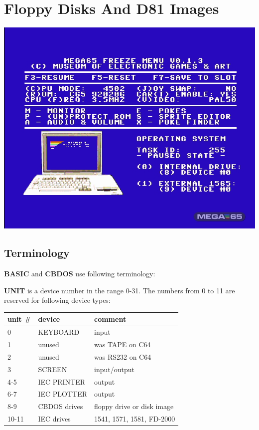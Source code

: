 \chapter{Floppy Disks And D81 Images}
\label{cha:freezer}


\includegraphics[width=\linewidth]{images/freezer.jpg}

\section{Terminology}

{\bf BASIC} and {\bf CBDOS} use following terminology:

{\bf UNIT} is a device number in the range 0-31.
The numbers from 0 to 11 are reserved for following device types:

{\ttfamily
\setlength{\tabcolsep}{1mm}
\begin{tabular}{|l|l|l|}
\hline
 unit \# & device  & comment \\
\hline
0        & KEYBOARD & input \\
1        & unused   & was TAPE on C64 \\
2        & unused   & was RS232 on C64 \\
3        & SCREEN   & input/output     \\
4-5      & IEC PRINTER  & output     \\
6-7      & IEC PLOTTER  & output     \\
8-9      & CBDOS drives & floppy drive or disk image \\
10-11    & IEC drives   & 1541, 1571, 1581, FD-2000 \\
\hline
\end{tabular}
}

